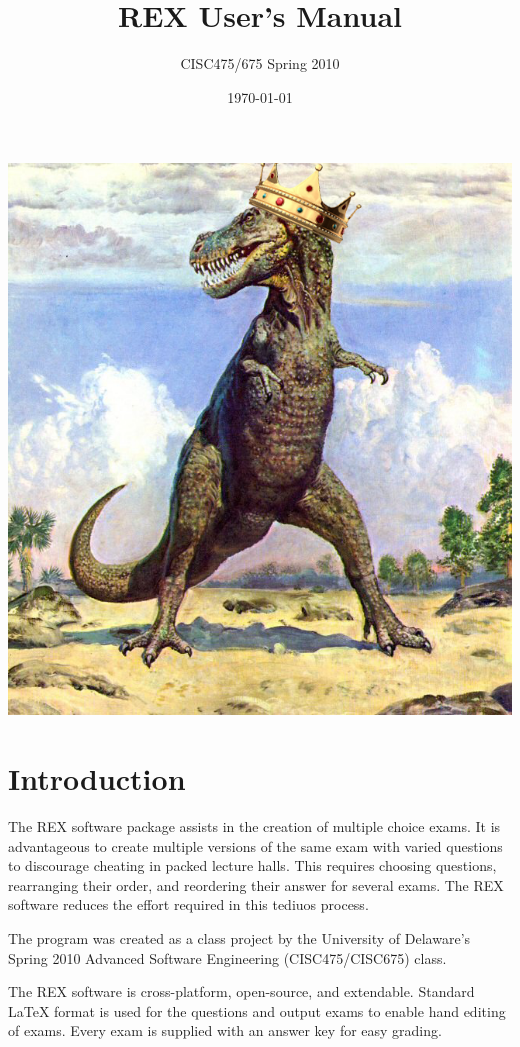 \documentclass{article}
\author{CISC475/675 Spring 2010}
\title{REX User's Manual}
\date{\today}
\begin{document}
\maketitle
\begin{center}
\includegraphics{rex.png}
\end{center}

\newpage
\tableofcontents
\newpage

\section{Introduction}
The REX software package assists in the creation of multiple choice exams.
It is advantageous to create multiple versions of the same exam with varied
questions to discourage cheating in packed lecture halls. This requires choosing
questions, rearranging their order, and reordering their answer for several
exams. The REX software reduces the effort required in this tediuos process.

The program was created as a class project by the University of Delaware's 
Spring 2010 Advanced Software Engineering (CISC475/CISC675) class. 

The REX software is cross-platform, open-source, and extendable. Standard 
\LaTeX{} format is used for the questions and output exams to enable hand editing
of exams. Every exam is supplied with an answer key for easy grading. 
\end{document}
